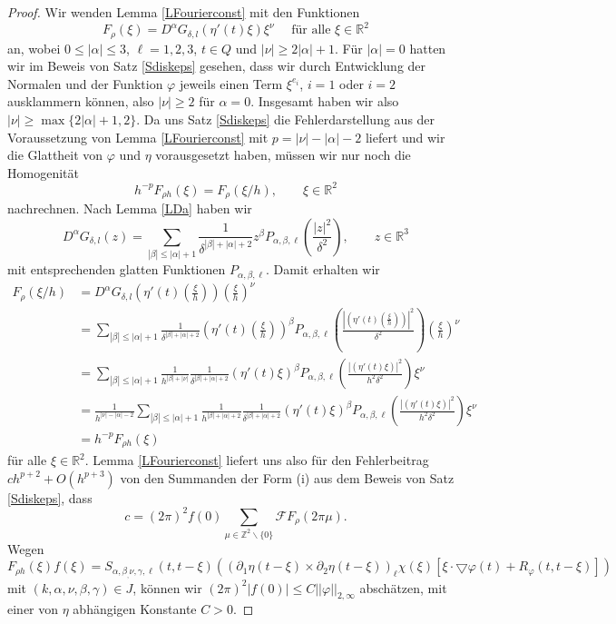 \documentclass[12pt,a4paper]{scrartcl}
\numberwithin{equation}{section}
\newcommand{\R}{\mathbb{R}} %
\newcommand{\Z}{\mathbb{Z}} %
\newcommand{\F}{\mathcal{F}} %
\newcommand{\grad}{\bigtriangledown}
\begin{document}
\begin{proof}
Wir wenden Lemma \ref{LFourierconst} mit den Funktionen 
\[
F_\rho(\xi)= D^\alpha G_{\delta,l}(\eta'(t)\xi) \xi^{\nu} \quad \text{ für alle } \xi \in \R^2
\] an, wobei $0 \leq |\alpha|\leq 3$, $\ell=1,2,3$, $t\in Q$ und $|\nu| \geq 2|\alpha|+ 1$.
Für $|\alpha|=0$ hatten wir im Beweis von Satz \ref{Sdiskeps} gesehen, dass wir durch Entwicklung der Normalen und der Funktion $\varphi$ jeweils einen Term $\xi^{e_i}$, $i=1$ oder $i=2$ ausklammern können, also $|\nu|\geq 2$ für $\alpha=0$. Insgesamt haben wir also $|\nu| \geq \max\{2|\alpha|+ 1,2\}$.
Da uns Satz \ref{Sdiskeps} die Fehlerdarstellung aus der Voraussetzung von Lemma \ref{LFourierconst} mit $p=|\nu|-|\alpha|-2$ liefert und wir die Glattheit von $\varphi$ und $\eta$ vorausgesetzt haben, müssen wir nur noch die Homogenität
\[
h^{-p} F_{\rho h}(\xi) = F_\rho(\xi/h), \qquad \xi \in \R^2
\]
nachrechnen. Nach Lemma \ref{LDa} haben wir
\[
D^\alpha G_{\delta,l}(z) = \sum_{|\beta|\leq |\alpha|+1}\frac{1}{\delta^{|\beta|+|\alpha|+2}}z^\beta P_{\alpha,\beta,\ell} \left(\frac{|z|^2}{\delta^2}\right), \qquad z\in\R^3
\]
mit entsprechenden glatten Funktionen $P_{\alpha,\beta,\ell}$. Damit erhalten wir
\begin{align*}
F_\rho(\xi/h) &=  D^\alpha G_{\delta,l}\left(\eta'(t)\left(\frac{\xi}{h}\right)\right) \left(\frac{\xi}{h}\right)^{\nu} \\
&= \sum_{|\beta|\leq |\alpha|+1}\frac{1}{\delta^{|\beta|+|\alpha|+2}}\left(\eta'(t)\left(\frac{\xi}{h}\right)\right)^\beta P_{\alpha,\beta,\ell} \left(\frac{|\left(\eta'(t)\left(\frac{\xi}{h}\right)\right)|^2}{\delta^2}\right)\left(\frac{\xi}{h}\right)^{\nu} \\
&= \sum_{|\beta|\leq |\alpha|+1}\frac{1}{h^{|\beta|+|\nu|}} \frac{1}{\delta^{|\beta|+|\alpha|+2}}\left(\eta'(t)\xi \right)^\beta P_{\alpha,\beta,\ell} \left(\frac{|\left(\eta'(t)\xi\right)|^2}{h^2 \delta^2}\right)\xi^{\nu} \\
&= \frac{1}{h^{|\nu|-|\alpha|-2}}\sum_{|\beta|\leq |\alpha|+1}\frac{1}{h^{|\beta|+|\alpha|+2}} \frac{1}{\delta^{|\beta|+|\alpha|+2}}\left(\eta'(t)\xi \right)^\beta P_{\alpha,\beta,\ell} \left(\frac{|\left(\eta'(t)\xi\right)|^2}{h^2 \delta^2}\right)\xi^{\nu}\\
&= h^{-p} F_{\rho h}(\xi)
\end{align*}
für alle $\xi \in \R^2$. Lemma \ref{LFourierconst} liefert uns also für den Fehlerbeitrag $ch^{p+2} + O(h^{p+3})$ von den Summanden der Form (i) aus dem Beweis von Satz \ref{Sdiskeps}, dass
\[
c= (2 \pi)^2 f(0) \sum_{\mu \in \Z^2 \backslash \{0\} } \F F_\rho(2 \pi \mu).
\] 
Wegen \[F_{\rho h}(\xi)f(\xi)= S_{\alpha,\beta_,\nu,\gamma,\ell}(t,t-\xi)\left((\partial_1 \eta (t-\xi) \times \partial_2 \eta(t-\xi))_\ell\chi(\xi)\left[\xi \cdot \grad\varphi(t) + R_\varphi(t,t-\xi) \right] \right)\] 
mit $(k,\alpha,\nu,\beta,\gamma) \in J$, können wir $(2\pi)^2 |f(0)| \leq C ||\varphi||_{2,\infty}$ abschätzen, mit einer von $\eta$ abhängigen Konstante $C>0$. 


\end{proof}
\end{document}
